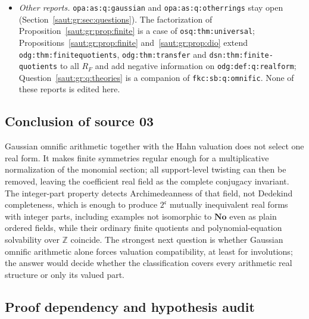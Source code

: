 \documentclass[11pt]{article}
\theoremstyle{definition}
\theoremstyle{remark}
\newcommand{\No}{\mathbf{No}}
\newcommand{\Z}{\mathbb Z}
\newcommand{\lbl}[1]{\nolinkurl{#1}}%
\newcommand{\cc}{\mathfrak c}
\numberwithin{equation}{section}
\begin{document}
\begin{itemize}
complexity bound); the obstacle noted in Section~\ref{saut:sec:kernels}
(Remark~\ref{saut:gr:rem:kernel}).
\item \emph{Other reports.} \lbl{opa:as:q:gaussian} and \lbl{opa:as:q:otherrings} stay
open (Section~\ref{saut:gr:sec:questions}). The factorization of
Proposition~\ref{saut:gr:prop:finite} is a case of \lbl{osq:thm:universal};
Propositions~\ref{saut:gr:prop:finite} and~\ref{saut:gr:prop:dio} extend
\lbl{odg:thm:finitequotients}, \lbl{odg:thm:transfer} and \lbl{dsn:thm:finite-quotients}
to all $R_F$ and add negative information on \lbl{odg:def:q:realform};
Question~\ref{saut:gr:q:theories} is a companion of \lbl{fkc:sb:q:omnific}. None of these
reports is edited here.
\end{itemize}

\subsection{Conclusion of source 03}

Gaussian omnific arithmetic together with the Hahn valuation does not select one real
form. It makes finite symmetries regular enough for a multiplicative normalization of the
monomial section; all support-level twisting can then be removed, leaving the coefficient
real field as the complete conjugacy invariant. The integer-part property detects
Archimedeanness of that field, not Dedekind completeness, which is enough to produce
$2^{\cc}$ mutually inequivalent real forms with integer parts, including examples not
isomorphic to $\No$ even as plain ordered fields, while their ordinary finite quotients and
polynomial-equation solvability over $\Z$ coincide. The strongest next question is
whether Gaussian omnific arithmetic alone forces valuation compatibility, at least for
involutions; the answer would decide whether the classification covers every arithmetic
real structure or only its valued part.

\subsection{Proof dependency and hypothesis audit}
\end{document}
